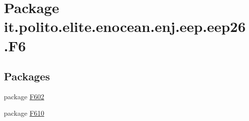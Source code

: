 \hypertarget{namespaceit_1_1polito_1_1elite_1_1enocean_1_1enj_1_1eep_1_1eep26_1_1_f6}{}\section{Package it.\+polito.\+elite.\+enocean.\+enj.\+eep.\+eep26.\+F6}
\label{namespaceit_1_1polito_1_1elite_1_1enocean_1_1enj_1_1eep_1_1eep26_1_1_f6}
\subsection*{Packages}
\begin{DoxyCompactItemize}
\item 
package \hyperlink{namespaceit_1_1polito_1_1elite_1_1enocean_1_1enj_1_1eep_1_1eep26_1_1_f6_1_1_f602}{F602}
\item 
package \hyperlink{namespaceit_1_1polito_1_1elite_1_1enocean_1_1enj_1_1eep_1_1eep26_1_1_f6_1_1_f610}{F610}
\end{DoxyCompactItemize}
